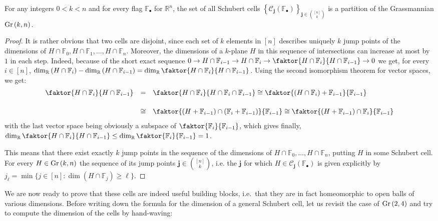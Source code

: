 \begin{lemma}\label{lem:jump_pts} For any integers $0<k<n$ and for every flag $\mathbb{F}_{\bullet}$ for $\mathbb{R}^n$, the set of all Schubert cells ${\left\{\mathcal{C}_{\mathbf{j}}(\mathbb{F}_{\bullet})\right\}}_{\mathbf{j}\in\binom{[n]}{k}}$ is a partition of the Grassmannian $\Gr{k}{n}$.
\end{lemma}
\begin{proof} It is rather obvious that two cells are disjoint, since each set of $k$ elements in $[n]$ describes uniquely $k$ jump points of the dimensions of $H\cap\mathbb{F}_0,H\cap\mathbb{F}_1,\ldots,H\cap\mathbb{F}_n$. Moreover, the dimensions of a $k$-plane $H$ in this sequence of intersections can increase at most by $1$ in each step. Indeed, because of the short exact sequence
$0\to H\cap\mathbb{F}_{i-1}\to H\cap\mathbb{F}_i\to\faktor{H\cap\mathbb{F}_i}{H\cap\mathbb{F}_{i-1}}\to0$
we get, for every $i\in[n]$,
$\dim_{\mathbb{R}}\left(H\cap\mathbb{F}_i\right)-\dim_{\mathbb{R}}\left(H\cap\mathbb{F}_{i-1}\right)=\dim_{\mathbb{R}}\faktor{H\cap\mathbb{F}_i}{H\cap\mathbb{F}_{i-1}}$.
Using the second isomorphism theorem for vector spaces, we get:
\[\begin{array}{>{\displaystyle}r>{\displaystyle}c>{\displaystyle}l}\faktor{H\cap\mathbb{F}_i}{H\cap\mathbb{F}_{i-1}}
&=&\faktor{H\cap\mathbb{F}_i}{H\cap\mathbb{F}_i\cap\mathbb{F}_{i-1}}\cong\faktor{(H\cap\mathbb{F}_i)+\mathbb{F}_{i-1}}{\mathbb{F}_{i-1}}\\[1.5em]
&\cong&\faktor{(H+\mathbb{F}_{i-1})\cap(\mathbb{F}_i+\mathbb{F}_{i-1})}{\mathbb{F}_{i-1}}\cong\faktor{(H+\mathbb{F}_{i-1})\cap\mathbb{F}_i}{\mathbb{F}_{i-1}}\\
\end{array}\]
with the last vector space being obviously a subspace of $\faktor{\mathbb{F}_i}{\mathbb{F}_{i-1}}$, which gives finally,
$\dim_{\mathbb{R}}\faktor{H\cap\mathbb{F}_i}{H\cap\mathbb{F}_{i-1}}\leq\dim_{\mathbb{R}}\faktor{\mathbb{F}_i}{\mathbb{F}_{i-1}}=1$.

This means that there exist exactly $k$ jump points in the sequence of the dimensions of $H\cap\mathbb{F}_0,\ldots,H\cap\mathbb{F}_n$, putting $H$ in some Schubert cell.
For every $H\in\Gr{k}{n}$ the sequence of its jump points $\mathbf{j}\in\binom{[n]}{k}$, i.e. the $\mathbf{j}$ for which $H\in\mathcal{C}_{\mathbf{j}}(\mathbb{F}_{\bullet})$ is given explicitly by
$j_{\ell}=\min\{j\in[n]:\dim(H\cap\mathbb{F}_j)\geq\ell\}$.
\end{proof}

We are now ready to prove that these cells are indeed useful building blocks, i.e.\ that they are in fact homeomorphic to open balls of various dimensions. Before writing down the formula for the dimension of a general Schubert cell, let us revisit the case of $\Gr{2}{4}$ and try to compute the dimension of the cells by hand-waving:

